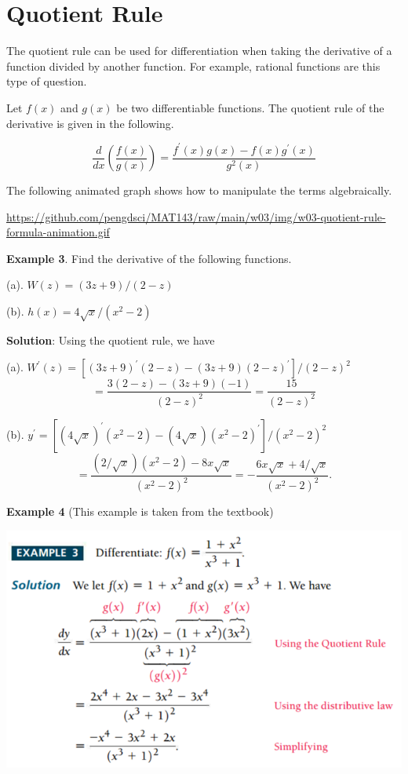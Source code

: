 \documentclass[
]{book}
\begin{document}
\hypertarget{quotient-rule-3}{%
\section{Quotient Rule}\label{quotient-rule-3}}

The quotient rule can be used for differentiation when taking the derivative of a function divided by another function. For example, rational functions are this type of question.

Let \(f(x)\) and \(g(x)\) be two differentiable functions. The quotient rule of the derivative is given in the following.

\[
\frac{d}{dx} \left(\frac{f(x)}{g(x)}\right)  = \frac{f^\prime(x)g(x) - f(x)g^\prime(x)}{g^2(x)}
\]

The following animated graph shows how to manipulate the terms algebraically.

\hfill\break

\url{https://github.com/pengdsci/MAT143/raw/main/w03/img/w03-quotient-rule-formula-animation.gif}

\hfill\break

\textbf{Example 3}. Find the derivative of the following functions.

(a). \(W(z) = (3z + 9)/(2 -z)\)

(b). \(h(x) = 4\sqrt{x}/(x^2 - 2)\)

\textbf{Solution}: Using the quotient rule, we have

(a). \(W^\prime(z) = [(3z+9)^\prime(2-z) - (3z+9)(2-z)^\prime]/(2-z)^2\)
\[
  = \frac{3(2-z)-(3z+9)(-1)}{(2-z)^2} = \frac{15}{(2-z)^2}
  \]

(b). \(y^\prime = \left[(4\sqrt{x})^\prime (x^2-2) -(4\sqrt{x})(x^2-2)^\prime\right]/(x^2-2)^2\)
\[
  = \frac{(2/\sqrt{x})(x^2-2)-8x\sqrt{x}}{(x^2-2)^2} = -\frac{6x\sqrt{x}+4/\sqrt{x}}{(x^2-2)^2}.
  \]

\hfill\break

\textbf{Example 4} (This example is taken from the textbook)

\begin{center}\includegraphics[width=0.7\linewidth]{img03/w03-quotientRuleExample} \end{center}
\end{document}
